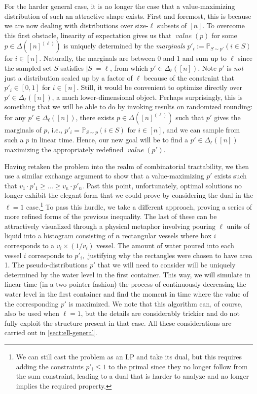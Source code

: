 \documentclass[sigconf,nonacm]{aamas}
\DeclareMathOperator{\valueText}{\textit{value}}
\newcommand{\val}[1]{\valueText({#1})}
\begin{document}
For the harder general case, it is no longer the case that a value-maximizing distribution of such an attractive shape exists. First and foremost, this is because we are now dealing with distributions over size-$\ell$ subsets of $[n]$. To overcome this first obstacle, linearity of expectation gives us that $\val{p}$ for some $p \in \Delta([n]^{(\ell)})$ is uniquely determined by the \emph{marginals} $p'_i := \mathbb{P}_{S \sim p'}(i \in S)$ for $i \in [n]$. Naturally, the marginals are between $0$ and $1$ and sum up to $\ell$ since the sampled set $S$ satisfies $|S| = \ell$, from which $p' \in \Delta_\ell([n])$. Note $p'$ is \emph{not} just a distribution scaled up by a factor of $\ell$ because of the constraint that $p'_i \in [0, 1]$ for $i \in [n]$. Still, it would be convenient to optimize directly over $p' \in \Delta_\ell([n])$, a much lower-dimensional object. Perhaps surprisingly, this is something that we will be able to do by invoking results on randomized rounding: for any $p' \in \Delta_\ell([n])$, there exists $p \in \Delta([n]^{(\ell)})$ such that $p'$ gives the marginals of $p$, i.e., $p'_i = \mathbb{P}_{S \sim p}(i \in S)$ for $i \in [n]$, and we can sample from such a $p$ in linear time.
Hence, our new goal will be to find a $p' \in \Delta_\ell([n])$ maximizing the appropriately redefined $\val{p'}$.

Having retaken the problem into the realm of combinatorial tractability, we then use a similar exchange argument to show that a value-maximizing $p'$ exists such that $v_1 \cdot p'_1 \geq \dots \geq v_n \cdot p'_n$. Past this point,  unfortunately, optimal solutions no longer exhibit the elegant form that we could prove by considering the dual in the $\ell = 1$ case.\footnote{We can still cast the problem as an LP and take its dual, but this requires adding the constraints $p'_i \leq 1$ to the primal since they no longer follow from the sum constraint, leading to a dual that is harder to analyze and no longer implies the required property.} To pass this hurdle, we take a different approach, proving a series of more refined forms of the previous inequality. The last of these can be attractively visualized through a physical metaphor involving pouring $\ell$ units of liquid into a histogram consisting of $n$ rectangular vessels where box $i$ corresponds to a $v_i \times (1 / v_i)$ vessel. The amount of water poured into each vessel $i$ corresponds to $p'_i,$ justifying why the rectangles were chosen to have area 1. The pseudo-distributions $p'$ that we will need to consider will be uniquely determined by the water level in the first container. This way, we will simulate in linear time (in a two-pointer fashion) the process of continuously decreasing the water level in the first container and find the moment in time where the value of the corresponding $p'$ is maximized. We note that this algorithm can, of course, also be used when $\ell = 1$, but the details are considerably trickier and do not fully exploit the structure present in that case. All these considerations are carried out in \cref{sect:ell-general}.
\end{document}
